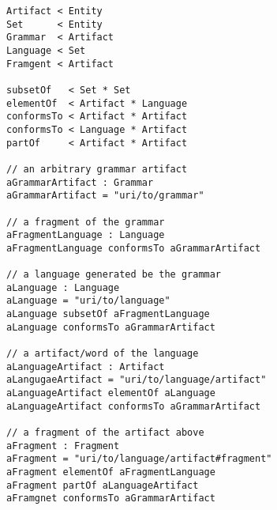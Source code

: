 \documentclass[runningheads,a4paper]{llncs}
\begin{document}
\begin{lstlisting}
Artifact < Entity
Set      < Entity
Grammar  < Artifact
Language < Set
Framgent < Artifact

subsetOf   < Set * Set
elementOf  < Artifact * Language
conformsTo < Artifact * Artifact
conformsTo < Language * Artifact
partOf     < Artifact * Artifact

// an arbitrary grammar artifact
aGrammarArtifact : Grammar
aGrammarArtifact = "uri/to/grammar"

// a fragment of the grammar
aFragmentLanguage : Language
aFragmentLanguage conformsTo aGrammarArtifact

// a language generated be the grammar
aLanguage : Language
aLanguage = "uri/to/language"
aLanguage subsetOf aFragmentLanguage
aLanguage conformsTo aGrammarArtifact

// a artifact/word of the language
aLanguageArtifact : Artifact
aLangugaeArtifact = "uri/to/language/artifact"
aLanguageArtifact elementOf aLanguage
aLanguageArtifact conformsTo aGrammarArtifact

// a fragment of the artifact above
aFragment : Fragment
aFragment = "uri/to/language/artifact#fragment"
aFragment elementOf aFragmentLanguage
aFragment partOf aLanguageArtifact
aFramgnet conformsTo aGrammarArtifact
\end{lstlisting}
\end{document}
